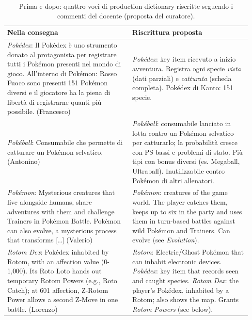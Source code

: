 \begin{table}[htbp]
\centering
\caption{Prima e dopo: quattro voci di production dictionary riscritte
seguendo i commenti del docente (proposta del curatore).}
\label{rv:t2:tab:prima-dopo}
\small
\begin{tabular}{@{}p{}p{}@{}}
  \toprule
  \textbf{Nella consegna} & \textbf{Riscrittura proposta} \\
  \midrule
  \emph{Pokédex}: Il Pokédex è uno strumento donato al protagonista per
  registrare tutti i Pokémon presenti nel mondo di gioco. All'interno di
  Pokémon: Rosso Fuoco sono presenti 151 Pokémon diversi e il giocatore ha la
  piena di libertà di registrarne quanti più possibile. (Francesco)
  &
  \emph{Pokédex}: key item ricevuto a inizio avventura. Registra ogni specie
  \emph{vista} (dati parziali) e \emph{catturata} (scheda completa).
  Pokédex di Kanto: 151 specie. \\
  \addlinespace
  \emph{Pokéball}: Consumabile che permette di catturare un Pokémon
  selvatico. (Antonino)
  &
  \emph{Pokéball}: consumabile lanciato in lotta contro un Pokémon selvatico
  per catturarlo; la probabilità cresce con PS bassi e problemi di stato.
  Più tipi con bonus diversi (es. Megaball, Ultraball). Inutilizzabile contro
  Pokémon di altri allenatori. \\
  \addlinespace
  \emph{Pokémon}: Mysterious creatures that live alongside humans, share
  adventures with them and challenge Trainers in Pokémon Battle. Pokémon can
  also evolve, a mysterious process that transforms [\dots] (Valerio)
  &
  \emph{Pokémon}: creatures of the game world. The player catches them, keeps
  up to six in the party and uses them in turn-based battles against wild
  Pokémon and Trainers. Can evolve (see \emph{Evolution}). \\
  \addlinespace
  \emph{Rotom Dex}: Pokédex inhabited by Rotom, with an affection value
  (0-1,000). Its Roto Loto hands out temporary Rotom Powers (e.g., Roto
  Catch); at 601 affection, Z-Rotom Power allows a second Z-Move in one
  battle. (Lorenzo)
  &
  \emph{Rotom}: Electric/Ghost Pokémon that can inhabit electronic
  devices.\newline
  \emph{Pokédex}: key item that records seen and caught species.\newline
  \emph{Rotom Dex}: the player's Pokédex, inhabited by a Rotom; also shows the map. Grants \emph{Rotom Powers} (see below). \\
  \bottomrule
\end{tabular}
\end{table}

